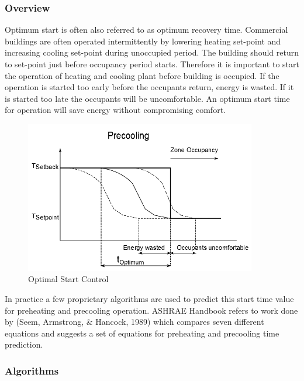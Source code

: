 \subsubsection{Overview}\label{overview-1-008}

Optimum start is often also referred to as optimum recovery time. Commercial buildings are often operated intermittently by lowering heating set-point and increasing cooling set-point during unoccupied period. The building should return to set-point just before occupancy period starts. Therefore it is important to start the operation of heating and cooling plant before building is occupied. If the operation is started too early before the occupants return, energy is wasted. If it is started too late the occupants will be uncomfortable. An optimum start time for operation will save energy without compromising comfort.

\begin{figure}[hbtp] %
\centering
\includegraphics[width=0.9\textwidth, height=0.9\textheight, keepaspectratio=true]{media/image6731.png}
\caption{Optimal Start Control \protect \label{fig:optimal-start-control}}
\end{figure}

In practice a few proprietary algorithms are used to predict this start time value for preheating and precooling operation. ASHRAE Handbook refers to work done by (Seem, Armstrong, \& Hancock, 1989) which compares seven different equations and suggests a set of equations for preheating and precooling time prediction.

\subsubsection{Algorithms}\label{algorithms}

